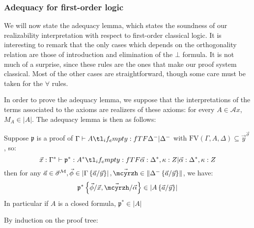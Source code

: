 \documentclass{CSML}
\newcommand*\ifpresent[3]{\tl_if_empty:fTF{#1}{#3}{#2}}
\newcommand*\Entails{\mathrel{\vdash}}
\newcommand*\BarSep{\mathrel{|}}
\newcommand*\Sequent[3]{#1\Entails#2\ifpresent{#3}{\BarSep}{}#3}
\newcommand*\FV[1]{\text{FV}\left(#1\right)}
\newcommand*\SortA{\sigma}
\newcommand*\LogSortedTerm[2]{#1^{#2}}
\newcommand*\LogVarB{y}
\newcommand*\LogNeg[1]{{#1^-}}
\newcommand*\LogBot\bot
\newcommand*\LogFormA{A}
\newcommand*\LogAxioms{\mathcal{A}x}
\newcommand*\LogProofA{\mathfrak{p}}
\newcommand*\LogSubst[1]{\left\{#1\right\}}
\newcommand*\ModM{\mathcal{M}}
\newcommand*\ModElemA{a}
\newcommand*\ModMInterp[1]{{#1}^\ModM}
\newcommand*\LmSortExtract{Z}
\newcommand*\LmTerm[2]{#1\mathrel{:}#2}
\newcommand*\LmVarA{x}
\newcommand*\LmMVarA\alpha
\newcommand*\LmInterpForm[1]{{#1}^*}
\newcommand*\LmInterpProof[1]{{#1}^*}
\newcommand*\LmInterpAxiom[1]{M_{#1}}
\newcommand*\CatRCHomA\phi
\newcommand*\CatCHomA\mcyrzh
\newcommand*\RealValNeg[1]{\left\|#1\right\|}
\newcommand*\RealVal[1]{\left|#1\right|}
\begin{document}
\subsubsection{Adequacy for first-order logic}
We will now state the adequacy lemma, which states the soundness of our realizability interpretation with respect to first-order classical logic. It is interesting to remark that the only cases which depends on the orthogonality relation are those of introduction and elimination of the $\LogBot$ formula. It is not much of a surprise, since these rules are the ones that make our proof system classical. Most of the other cases are straightforward, though some care must be taken for the $\forall$ rules.\par
In order to prove the adequacy lemma, we suppose that the interpretations of the terms associated to the axioms are realizers of these axioms: for every $\LogFormA\in\LogAxioms$, $\LmInterpAxiom{\LogFormA}\in\RealVal{\LogFormA}$. The adequacy lemma is then as follows:
\begin{lem}
\label{adequacyLemma}
Suppose $\LogProofA$ is a proof of $\Sequent{\Gamma}{\LogFormA}{\LogNeg{\Delta}}$ with $\FV{\Gamma,\LogFormA,\Delta}\subseteq\LogSortedTerm{\vec{\LogVarB}}{\vec{\SortA}}$, so:
$$\Sequent{\LmTerm{\vec{\LmVarA}}{\LmInterpForm{\Gamma}}}{\LmTerm{\LmInterpProof{\LogProofA}}{\LmInterpForm{\LogFormA}}}{\LmTerm{\vec{\LmMVarA}}{\LmInterpForm{\Delta}},\LmTerm{\kappa}{\LmSortExtract}}$$
then for any $\vec{\ModElemA}\in\ModMInterp{\vec{\SortA}},\vec{\CatRCHomA}\in\RealVal{\Gamma\LogSubst{\vec{\ModElemA}/\vec{\LogVarB}}},\vec{\CatCHomA}\in\RealValNeg{\LogNeg{\Delta}\LogSubst{\vec{\ModElemA}/\vec{\LogVarB}}}$, we have:
$$\LmInterpProof{\LogProofA}\LogSubst{\vec{\CatRCHomA}/\vec{\LmVarA},\vec{\CatCHomA}/\vec{\LmMVarA}}\in\RealVal{\LogFormA\LogSubst{\vec{\ModElemA}/\vec{\LogVarB}}}$$
In particular if $\LogFormA$ is a closed formula, $\LmInterpProof{\LogProofA}\in\RealVal{\LogFormA}$
\end{lem}
\proof
By induction on the proof tree:
\end{document}
